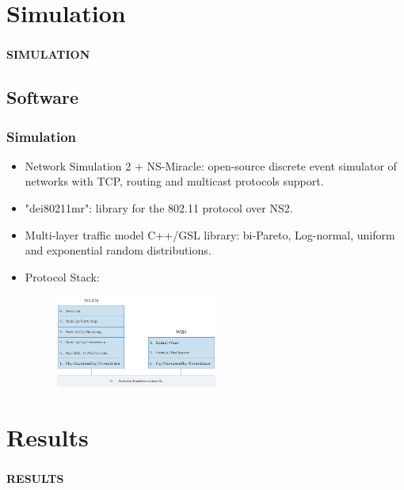 \documentclass[9pt,handout,serif]{beamer}
\begin{document}
\section{Simulation}

\begin{frame}[c]
	\frametitle{}
	\begin{center}
		\textbf{\Huge{SIMULATION}}
	\end{center}
\end{frame}

\subsection{Software}
\begin{frame}[c]
	\frametitle{Simulation}
	\begin{itemize}
		\item Network Simulation 2 + NS-Miracle: open-source discrete event simulator of networks with TCP, routing and multicast protocols support.
		\item "dei80211mr": library for the 802.11 protocol over NS2.
		\item Multi-layer traffic model C++/GSL library: bi-Pareto, Log-normal, uniform and exponential random distributions.
		\item Protocol Stack:
			\begin{figure}
				\includegraphics[width=0.5\textwidth]{../images/simulation/protocol_stack}
			\end{figure}
	\end{itemize}
\end{frame}

\section{Results}

\begin{frame}[c]
	\frametitle{}
	\begin{center}
		\textbf{\Huge{RESULTS}}
	\end{center}
\end{frame}
\end{document}
